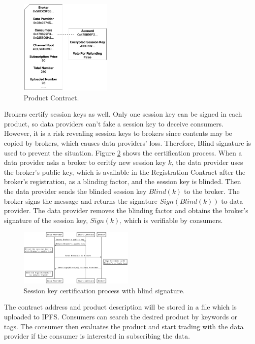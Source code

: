 \documentclass[journal,a4paper]{IEEEtran}
\begin{document}
\begin{figure}[h]
\centering
\includegraphics[width=0.4\textwidth]{product_contract}
\caption{Product Contract.}
\label{fig:product_contract}
\end{figure}

Brokers certify session keys as well. Only one session key can be signed in each product, so data providers can't fake a session key to deceive consumers. However, it is a risk revealing session keys to brokers since contents may be copied by brokers, which causes data providers' loss. Therefore, Blind signature is used to prevent the situation. Figure \ref{fig:key_certification} shows the certification process. When a data provider asks a broker to ceritfy new session key $k$, the data provider uses the broker's public key, which is available in the Registration Contract after the broker's registration, as a blinding factor, and the session key is blinded. Then the data provider sends the blinded session key $Blind(k)$ to the broker. The broker signs the message and returns the signature $Sign(Blind(k))$ to data provider. The data provider removes the blinding factor and obtains the broker's signature of the session key, $Sign(k)$, which is verifiable by consumers.

\begin{figure}[h]
	\centering
	\includegraphics[width=0.5\textwidth]{key_certification}
	\caption{Session key certification process with blind signature.}
	\label{fig:key_certification}
\end{figure}

The contract address and product description will be stored in a file which is uploaded to IPFS. Consumers can search the desired product by keywords or tags. The consumer then evaluates the product and start trading with the data provider if the consumer is interested in subscribing the data.
\end{document}
